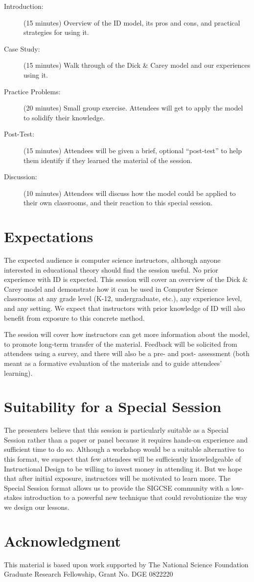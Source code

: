 \documentclass{sig-alternate}
\begin{document}
\begin{description}
\item[Introduction:] (15 minutes) Overview of the ID model, its pros and cons, and practical strategies for using it.
\item[Case Study:] (15 minutes) Walk through of the Dick \& Carey model and our experiences using it.
\item[Practice Problems:] (20 minutes) Small group exercise. Attendees will get to apply the model to solidify their knowledge.
\item[Post-Test:] (15 minutes) Attendees will be given a brief, optional ``post-test'' to help them identify if they learned the material of the session.
\item[Discussion:] (10 minutes) Attendees will discuss how the model could be applied to their own classrooms, and their reaction to this special session.
\end{description}

\section{Expectations}

The expected audience is computer science instructors, although anyone interested in educational theory should find the session useful.
No prior experience with ID is expected.
This session will cover an overview of the Dick \& Carey model and demonstrate how it can be used in Computer Science classrooms at any grade level (K-12, undergraduate, etc.), any experience level, and any setting.
We expect that instructors with prior knowledge of ID will also benefit from exposure to this concrete method.

The session will cover how instructors can get more information about the model, to promote long-term transfer of the material.
Feedback will be solicited from attendees using a survey, and there will also be a pre- and post- assessment (both meant as a formative evaluation of the materials and to guide attendees' learning).

\section{Suitability for a Special Session}

The presenters believe that this session is particularly suitable as a Special Session rather than a paper or panel because it requires hands-on experience and sufficient time to do so.
Although a workshop would be a suitable alternative to this format, we suspect that few attendees will be sufficiently knowledgeable of Instructional Design to be willing to invest money in attending it.
But we hope that after initial exposure, instructors will be motivated to learn more.
The Special Session format allows us to provide the SIGCSE community with a low-stakes introduction to a powerful new technique that could revolutionize the way we design our lessons.

\section{Acknowledgment}

This material is based upon work supported by The National Science Foundation Graduate Research Fellowship, Grant No. DGE 0822220



 
\end{document}
